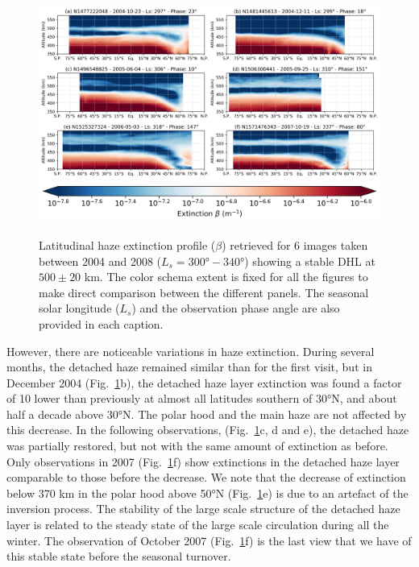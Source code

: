 \begin{figure}[!ht]
    \centering
    \includegraphics[width=\textwidth]{Fig/Lat_beta-2004_2008.png}
    \includegraphics[width=.5\textwidth]{Fig/Extinction_colorbar.png}\vspace{-.3cm}
    \caption{Latitudinal haze extinction profile ($\beta$) retrieved for 6 images taken between 2004 and 2008
    ($L_s=\ang{300}-\ang{340}$) showing a stable DHL at $500 \pm 20$ km.
    The color schema extent is fixed for all the figures to make direct comparison
    between the different panels. The seasonal solar longitude ($L_s$) and the observation phase angle are
    also provided in each caption.}
    \label{fig:dhl_2004_2008}
\end{figure}

However, there are noticeable variations in haze extinction. During several months, the
detached haze remained similar than for the first visit, but in December 2004 (Fig.~\ref{fig:dhl_2004_2008}b),
the detached haze layer extinction was found a factor of 10 lower than previously at almost all latitudes southern
of \ang{30}N, and about half a decade above \ang{30}N. The polar hood and the main haze are not affected by this decrease.
In the following observations, (Fig.~\ref{fig:dhl_2004_2008}c, d and e),
the detached haze was partially restored, but not with the same amount of extinction as before. Only observations in
2007 (Fig.~\ref{fig:dhl_2004_2008}f) show extinctions in the detached haze layer comparable to those before
the decrease. We note that the decrease of extinction below 370 km in the polar hood above \ang{50}N
(Fig.~\ref{fig:dhl_2004_2008}e) is due to an artefact of the inversion process. The stability of the large scale
structure of the detached haze layer is related to the steady state of the large scale circulation during all the winter.
The observation of October 2007 (Fig.~\ref{fig:dhl_2004_2008}f) is the last view that we have of this stable state
before the seasonal turnover.

